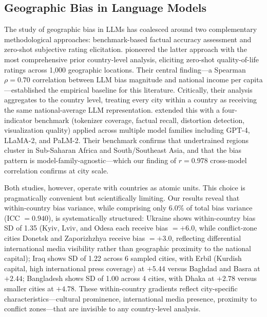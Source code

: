 \documentclass[12pt]{article}
\begin{document}
\subsection{Geographic Bias in Language Models}

The study of geographic bias in LLMs has coalesced around two complementary methodological approaches: benchmark-based factual accuracy assessment and zero-shot subjective rating elicitation. \citet{manvi2024geographically} pioneered the latter approach with the most comprehensive prior country-level analysis, eliciting zero-shot quality-of-life ratings across 1,000 geographic locations. Their central finding---a Spearman $\rho = 0.70$ correlation between LLM bias magnitude and national income per capita---established the empirical baseline for this literature. Critically, their analysis aggregates to the country level, treating every city within a country as receiving the same national-average LLM representation. \citet{decoupes2025geographical} extended this with a four-indicator benchmark (tokenizer coverage, factual recall, distortion detection, visualization quality) applied across multiple model families including GPT-4, LLaMA-2, and PaLM-2. Their benchmark confirms that undertrained regions cluster in Sub-Saharan Africa and South/Southeast Asia, and that the bias pattern is model-family-agnostic---which our finding of $r = 0.978$ cross-model correlation confirms at city scale.

Both studies, however, operate with countries as atomic units. This choice is pragmatically convenient but scientifically limiting. Our results reveal that within-country bias variance, while comprising only 6.0\% of total bias variance (ICC $= 0.940$), is systematically structured: Ukraine shows within-country bias SD of 1.35 (Kyiv, Lviv, and Odesa each receive bias $= +6.0$, while conflict-zone cities Donetsk and Zaporizhzhya receive bias $= +3.0$, reflecting differential international media visibility rather than geographic proximity to the national capital); Iraq shows SD of 1.22 across 6 sampled cities, with Erbil (Kurdish capital, high international press coverage) at $+5.44$ versus Baghdad and Basra at $+2.44$; Bangladesh shows SD of 1.00 across 4 cities, with Dhaka at $+2.78$ versus smaller cities at $+4.78$. These within-country gradients reflect city-specific characteristics---cultural prominence, international media presence, proximity to conflict zones---that are invisible to any country-level analysis.
\end{document}
